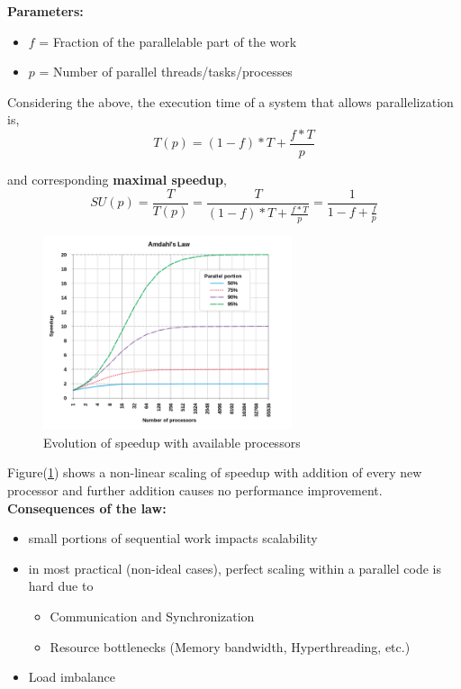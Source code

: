 \documentclass[12pt, a4paper]{report}
\begin{document}
{\bfseries Parameters:}
\begin{itemize}
    \item $f$ = Fraction of the parallelable part of the work
    \item $p$ = Number of parallel threads/tasks/processes    
\end{itemize}

Considering the above, the execution time of a system that allows parallelization is,
\begin{equation*}
    T(p)=(1-f) * T+\frac{f * T}{p}
\end{equation*}

and corresponding {\bfseries maximal speedup},
\begin{equation*}
    SU(p)=\frac{T}{T(p)}=\frac{T}{(1-f) * T+\frac{f * T}{p}}=\frac{1}{1-f+\frac{f}{p}}
\end{equation*}

\begin{figure}[h]
    \centering
    \includegraphics[width=0.65\textwidth]{AmdahlsLaw}
    \caption{Evolution of speedup with available processors}
    \label{fig:AmdahlsLaw}
\end{figure}
Figure(\ref{fig:AmdahlsLaw}) shows a non-linear scaling of speedup with addition of every new processor and 
further addition causes no performance improvement.\\

{\bfseries Consequences of the law:} 
\begin{itemize}
    \item small portions of sequential work impacts scalability
    \item in most practical (non-ideal cases), perfect scaling within a parallel code is hard due to
        \begin{itemize}
            \item Communication and Synchronization
            \item Resource bottlenecks (Memory bandwidth, Hyperthreading, etc.)
        \end{itemize}
    \item Load imbalance
\end{itemize}
\end{document}
